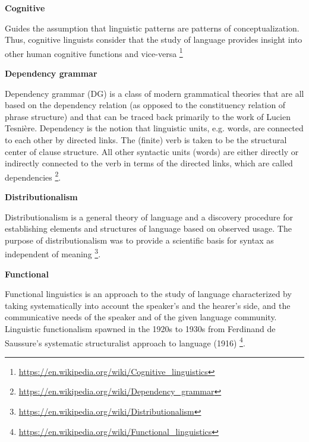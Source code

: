 \documentclass{book}
\providecommand{\ProjectDeepHeading}[2]{%
    \par\medskip\noindent\textbf{#2}\par\smallskip
}
\providecommand{\seeherefooter}[1]{\footnote{\url{#1}}}
\begin{document}
\ProjectDeepHeading{5}{Cognitive}


Guides the assumption that linguistic patterns are patterns of conceptualization. Thus, cognitive linguists consider that the study of language provides insight into other human cognitive functions and vice-versa \seeherefooter{https://en.wikipedia.org/wiki/Cognitive_linguistics}

\ProjectDeepHeading{5}{Dependency grammar}


Dependency grammar (DG) is a class of modern grammatical theories that are all based on the dependency relation (as opposed to the constituency relation of phrase structure) and that can be traced back primarily to the work of Lucien Tesnière. Dependency is the notion that linguistic units, e.g. words, are connected to each other by directed links. The (finite) verb is taken to be the structural center of clause structure. All other syntactic units (words) are either directly or indirectly connected to the verb in terms of the directed links, which are called dependencies \seeherefooter{https://en.wikipedia.org/wiki/Dependency_grammar}.

\ProjectDeepHeading{5}{Distributionalism}


Distributionalism is a general theory of language and a discovery procedure for establishing elements and structures of language based on observed usage. The purpose of distributionalism was to provide a scientific basis for syntax as independent of meaning \seeherefooter{https://en.wikipedia.org/wiki/Distributionalism}.

\ProjectDeepHeading{5}{Functional}


Functional linguistics is an approach to the study of language characterized by taking systematically into account the speaker's and the hearer's side, and the communicative needs of the speaker and of the given language community. Linguistic functionalism spawned in the 1920s to 1930s from Ferdinand de Saussure's systematic structuralist approach to language (1916) \seeherefooter{https://en.wikipedia.org/wiki/Functional_linguistics}.
    
\end{document}

